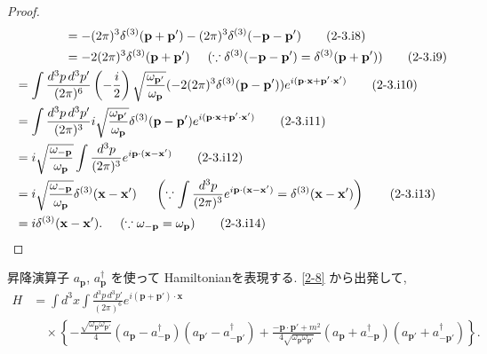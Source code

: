 \documentclass[a4paper,12pt]{article}
\begin{document}
\begin{proof}
\begin{align*}
&\quad \hspace{1.05cm} = - (2\pi)^3 \delta^{(3)}(\mathbf{p} + \mathbf{p}') - (2\pi)^3 \delta^{(3)}(-\mathbf{p} - \mathbf{p}') \tag{2-3.i8}\\
&\quad \hspace{1.05cm} = -2 (2\pi)^3 \delta^{(3)}(\mathbf{p} + \mathbf{p}') \hspace{0.5cm} (\because \delta^{(3)}(-\mathbf{p} - \mathbf{p}') = \delta^{(3)}(\mathbf{p} + \mathbf{p}')) \tag{2-3.i9}\\
&= \int \frac{d^3p \, d^3p'}{(2\pi)^6} \left( -\frac{i}{2} \right) \sqrt{\frac{\omega_{\mathbf{p}'}}{\omega_{\mathbf{p}}}} (-2 (2\pi)^3 \delta^{(3)}(\mathbf{p} - \mathbf{p}')) e^{i(\mathbf{p}\cdot\mathbf{x} + \mathbf{p}'\cdot\mathbf{x}')} \tag{2-3.i10}\\
&= \int \frac{d^3p \, d^3p'}{(2\pi)^3} i \sqrt{\frac{\omega_{\mathbf{p}'}}{\omega_{\mathbf{p}}}} \delta^{(3)}(\mathbf{p} - \mathbf{p}') e^{i(\mathbf{p}\cdot\mathbf{x} + \mathbf{p}'\cdot\mathbf{x}')} \tag{2-3.i11}\\
&= i \sqrt{\frac{\omega_{-\mathbf{p}}}{\omega_{\mathbf{p}}}} \int \frac{d^3 p}{(2\pi)^3} e^{i\mathbf{p}\cdot(\mathbf{x} - \mathbf{x}')} \tag{2-3.i12}\\
&= i \sqrt{\frac{\omega_{-\mathbf{p}}}{\omega_{\mathbf{p}}}} \delta^{(3)}(\mathbf{x} - \mathbf{x}') \hspace{0.5cm} \left(\because \int \frac{d^3 p}{(2\pi)^3} e^{i\mathbf{p}\cdot(\mathbf{x} - \mathbf{x}')} = \delta^{(3)}(\mathbf{x} - \mathbf{x}')\right) \tag{2-3.i13}\\
&= i \delta^{(3)}(\mathbf{x} - \mathbf{x}'). \hspace{0.5cm} (\because \omega_{-\mathbf{p}} = \omega_{\mathbf{p}}) \tag{2-3.i14}
\end{align*}
\end{proof}


\color{black}

\vspace{0.5em}

昇降演算子 $a_{\mathbf{p}}$, $a^\dagger_{\mathbf{p}}$ を使って Hamiltonianを表現する. \eqref{2-8} から出発して,
\begin{align*}
H &= \int d^3x \int \frac{d^3p\, d^3p'}{(2\pi)^6} e^{i(\mathbf{p}+\mathbf{p}')\cdot\mathbf{x}} \\
&\quad \times \left\{ -\frac{\sqrt{\omega_{\mathbf{p}}\omega_{\mathbf{p}'}}}{4} (a_{\mathbf{p}} - a^\dagger_{-\mathbf{p}})(a_{\mathbf{p}'} - a^\dagger_{-\mathbf{p}'})
+ \frac{-\mathbf{p}\cdot\mathbf{p}' + m^2}{4\sqrt{\omega_{\mathbf{p}}\omega_{\mathbf{p}'}}} (a_{\mathbf{p}} + a^\dagger_{-\mathbf{p}})(a_{\mathbf{p}'} + a^\dagger_{-\mathbf{p}'}) \right\} .
\end{align*}
\end{document}
